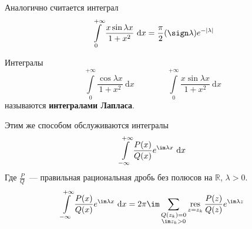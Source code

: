 \documentclass{article}
\begin{document}
    \begin{remark}
        Аналогично считается интеграл
        $$
        \int\limits_0^{+\infty}\frac{x\sin\lambda x}{1+x^2}~\mathrm dx=\frac\pi2(\sign\lambda)e^{-|\lambda|}
        $$
    \end{remark}
    \begin{definition}
        Интегралы
        $$
        \int\limits_0^{+\infty}\frac{\cos\lambda x}{1+x^2}~\mathrm dx\qquad\qquad\int\limits_0^{+\infty}\frac{x\sin\lambda x}{1+x^2}~\mathrm dx
        $$
        называются \textbf{интегралами Лапласа}.
    \end{definition}
    \begin{remark}
        Этим же способом обслуживаются интегралы
        $$
        \int\limits_{-\infty}^{+\infty}\frac{P(x)}{Q(x)}e^{\im\lambda x}~\mathrm dx
        $$
        Где $\frac PQ$~--- правильная рациональная дробь без полюсов на $\mathbb R$, $\lambda>0$.
        $$
        \int\limits_{-\infty}^{+\infty}\frac{P(x)}{Q(x)}e^{\im\lambda x}~\mathrm dx=2\pi\im\sum\limits_{\substack{Q(z_k)=0\\\im z_k>0}}\operatorname*{res}_{z=z_k}\frac{P(z)}{Q(z)}e^{\im\lambda z}
        $$
    \end{remark}
\end{document}
